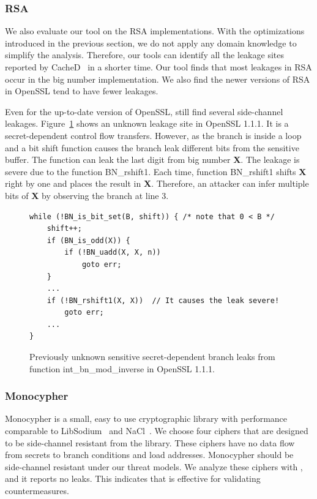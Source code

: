 \subsubsection{RSA}
We also evaluate our tool on the RSA implementations. With the optimizations
introduced in the previous section, we do not apply any domain knowledge to
simplify the analysis. Therefore, our tools can identify all the leakage sites
reported by CacheD~\cite{203878} in a shorter time. Our tool finds that most
leakages in RSA occur in the big number implementation. We also find the newer
versions of RSA in OpenSSL tend to have fewer leakages. 

Even for the up-to-date version of OpenSSL, \detect{} still find several
side-channel leakages. Figure~\ref{chapter3:fig:unknown_leakage} shows an unknown leakage site in OpenSSL 1.1.1. It is a secret-dependent control flow transfers. 
However, as the branch is inside a loop and a bit shift function causes the branch leak different bits from the sensitive buffer. The function can leak the last digit from big number \textbf{X}. The leakage is severe due to the 
function \textsf{BN\_rshift1}. Each time, function \textsf{BN\_rshift1}
shifts \textbf{X} right by one and places the result in \textbf{X}. Therefore,
an attacker can infer multiple bits of \textbf{X} by observing the branch at line 3.

\begin{figure}[ht]
\centering
\begin{lstlisting}[xleftmargin=.1\textwidth,xrightmargin=.01\textwidth]
while (!BN_is_bit_set(B, shift)) { /* note that 0 < B */
    shift++;
    if (BN_is_odd(X)) {
        if (!BN_uadd(X, X, n))
            goto err;
    }
    ...
    if (!BN_rshift1(X, X))  // It causes the leak severe!
        goto err;
    ...
}
\end{lstlisting}
    \caption{Previously unknown sensitive secret-dependent branch leaks from function 
             \textsf{int\_bn\_mod\_inverse} in OpenSSL 1.1.1. }
    \label{chapter3:fig:unknown_leakage}
\end{figure}


\subsubsection{Monocypher}\label{eval:mono}
Monocypher is a small, easy to use cryptographic library with
performance comparable to LibSodium~\cite{libsodium} and NaCl~\cite{bernstein2012security}.
We choose four ciphers that are
designed to be side-channel resistant from the library.
These ciphers have no
data flow from secrets to branch conditions and load addresses.
Monocypher should be side-channel resistant under our threat models.
We analyze these ciphers with \detect{}, and it reports no leaks.
This indicates that \detect{} is effective for validating countermeasures.






